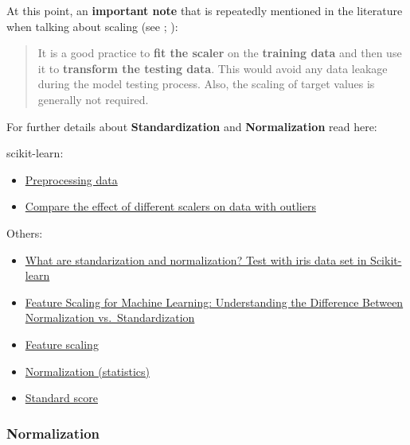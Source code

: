 \documentclass [oneside,10pt,a4paper,ngerman,BCOR10mm,headsepline,parindent,final]{scrartcl}
\providecommand{\tightlist}{%
      \setlength{\itemsep}{0pt}\setlength{\parskip}{0pt}}
\begin{document}
At this point, an \textbf{important note} that is repeatedly mentioned
in the literature when talking about scaling (see
\cite{feature_scaling_2020}; \cite{Geron_2018}):

\begin{quote}
It is a good practice to \textbf{fit the scaler} on the \textbf{training
data} and then use it to \textbf{transform the testing data}. This would
avoid any data leakage during the model testing process. Also, the
scaling of target values is generally not required.
\end{quote}

For further details about \textbf{Standardization} and
\textbf{Normalization} read here:

scikit-learn:

\begin{itemize}
\tightlist
\item
  \href{https://scikit-learn.org/stable/modules/preprocessing.html}{Preprocessing
  data}
\item
  \href{https://scikit-learn.org/stable/auto_examples/preprocessing/plot_all_scaling.html\#sphx-glr-auto-examples-preprocessing-plot-all-scaling-py}{Compare
  the effect of different scalers on data with outliers}
\end{itemize}

Others:

\begin{itemize}
\tightlist
\item
  \href{http://techflare.blog/what-are-standarization-and-normalization-test-with-iris-data-set-in-scikit-learn/}{What
  are standarization and normalization? Test with iris data set in
  Scikit-learn}
\item
  \href{https://www.analyticsvidhya.com/blog/2020/04/feature-scaling-machine-learning-normalization-standardization/?}{Feature
  Scaling for Machine Learning: Understanding the Difference Between
  Normalization vs.~Standardization}
\item
  \href{https://en.wikipedia.org/wiki/Feature_scaling}{Feature scaling}
\item
  \href{https://en.wikipedia.org/wiki/Normalization_(statistics)}{Normalization
  (statistics)}
\item
  \href{https://en.wikipedia.org/wiki/Standard_score}{Standard score}
\end{itemize}

    \hypertarget{normalization}{%
\subsubsection{Normalization}\label{normalization}}
\end{document}
